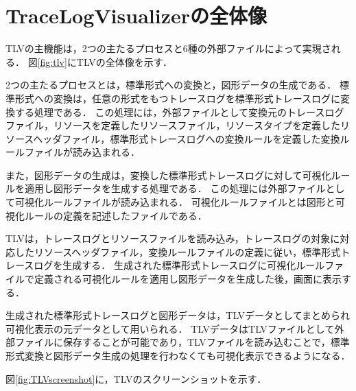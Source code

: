
\section{TraceLogVisualizerの全体像}

TLVの主機能は，2つの主たるプロセスと6種の外部ファイルによって実現される．
図\ref{fig:tlv}にTLVの全体像を示す．

2つの主たるプロセスとは，標準形式への変換と，図形データの生成である．
標準形式への変換は，任意の形式をもつトレースログを標準形式トレースログに変換する処理である．
この処理には，外部ファイルとして変換元のトレースログファイル，リソースを定義したリソースファイル，リソースタイプを定義したリソースヘッダファイル，標準形式トレースログへの変換ルールを定義した変換ルールファイルが読み込まれる．

また，図形データの生成は，変換した標準形式トレースログに対して可視化ルールを適用し図形データを生成する処理である．
この処理には外部ファイルとして可視化ルールファイルが読み込まれる．
可視化ルールファイルとは図形と可視化ルールの定義を記述したファイルである．

TLVは，トレースログとリソースファイルを読み込み，トレースログの対象に対応したリソースヘッダファイル，変換ルールファイルの定義に従い，標準形式トレースログを生成する．
生成された標準形式トレースログに可視化ルールファイルで定義される可視化ルールを適用し図形データを生成した後，画面に表示する．

生成された標準形式トレースログと図形データは，TLVデータとしてまとめられ可視化表示の元データとして用いられる．
TLVデータはTLVファイルとして外部ファイルに保存することが可能であり，TLVファイルを読み込むことで，標準形式変換と図形データ生成の処理を行わなくても可視化表示できるようになる．

図\ref{fig:TLVscreenshot}に，TLVのスクリーンショットを示す．

